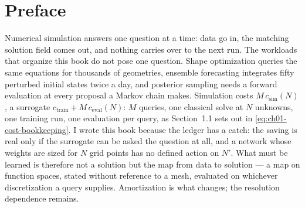 \chapter*{Preface}

Numerical simulation answers one question at a time: data go in, the matching solution field
comes out, and nothing carries over to the next run. The workloads that organize this book do
not pose one question. Shape optimization queries the same equations for thousands of
geometries, ensemble forecasting integrates fifty perturbed initial states twice a day, and
posterior sampling needs a forward evaluation at every proposal a Markov chain makes.
Simulation costs $M\,c_{\mathrm{sim}}(N)$, a surrogate $c_{\mathrm{train}} +
M\,c_{\mathrm{eval}}(N)$: $M$ queries, one classical solve at $N$ unknowns, one training run,
one evaluation per query, as Section~1.1 sets out in \eqref{eq:ch01-cost-bookkeeping}. I wrote
this book because the ledger has a catch: the saving is real only if the surrogate can be asked
the question at all, and a network whose weights are sized for $N$ grid points has no defined
action on $N'$. What must be learned is therefore not a solution but the map from data to
solution --- a map on function spaces, stated without reference to a mesh, evaluated on
whichever discretization a query supplies. Amortization is what changes; the resolution
dependence remains.

